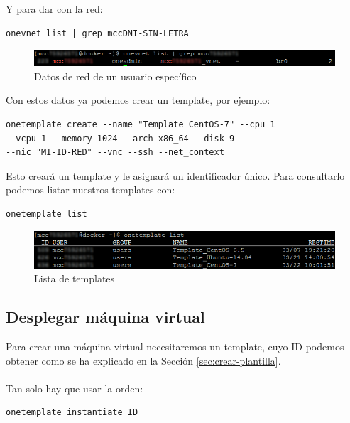 Y para dar con la red:

\begin{lstlisting}
onevnet list | grep mccDNI-SIN-LETRA
\end{lstlisting}

\begin{figure}[H]
	\centering
	\includegraphics[width=14cm]{img/onevnet-list}
	\caption{Datos de red de un usuario específico}
	\label{fig:onevnet-list}
\end{figure}

Con estos datos ya podemos crear un template, por ejemplo:

\begin{lstlisting}
onetemplate create --name "Template_CentOS-7" --cpu 1 
--vcpu 1 --memory 1024 --arch x86_64 --disk 9 
--nic "MI-ID-RED" --vnc --ssh --net_context
\end{lstlisting}

Esto creará un template y le asignará un identificador único. Para consultarlo podemos listar nuestros templates con:

\begin{lstlisting}
onetemplate list
\end{lstlisting}

\begin{figure}[H]
	\centering
	\includegraphics[width=14cm]{img/onetemplate-list}
	\caption{Lista de templates}
	\label{fig:onetemplate-list}
\end{figure}

\subsection{Desplegar máquina virtual}

Para crear una máquina virtual necesitaremos un template, cuyo ID podemos obtener como se ha explicado en la Sección \ref{sec:crear-plantilla}.
\\ \\
Tan solo hay que usar la orden:

\begin{lstlisting}
onetemplate instantiate ID
\end{lstlisting}

